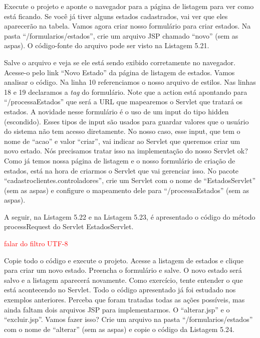 
Execute o projeto e aponte o navegador para a página de listagem para ver como está ficando. Se você já tiver alguns estados cadastrados, vai ver que eles aparecerão na tabela. Vamos agora criar nosso formulário para criar estados. Na pasta ``/formularios/estados'', crie um arquivo JSP chamado ``novo'' (sem as aspas). O código-fonte do arquivo pode ser visto na Listagem 5.21.


Salve o arquivo e veja se ele está sendo exibido corretamente no navegador. Acesse-o pelo link ``Novo Estado'' da página de listagem de estados. Vamos analisar o código. Na linha 10 referenciamos o nosso arquivo de estilos. Nas linhas 18 e 19 declaramos a \textit{tag} do formulário. Note que a action está apontando para ``/processaEstados'' que será a URL que mapearemos o Servlet que tratará os estados. A novidade nesse formulário é o uso de um input do tipo hidden (escondido). Esses tipos de input são usados para guardar valores que o usuário do sistema não tem acesso diretamente. No nosso caso, esse input, que tem o nome de ``acao'' e valor ``criar'', vai indicar ao Servlet que queremos criar um novo estado. Nós precisamos tratar isso na implementação do nosso Servlet ok? Como já temos nossa página de listagem e o nosso formulário de criação de estados, está na hora de criarmos o Servlet que vai gerenciar isso. No pacote ``cadastroclientes.controladores'', crie um Servlet com o nome de ``EstadosServlet'' (sem as aspas) e configure o mapeamento dele para ``/processaEstados'' (sem as aspas).

A seguir, na Listagem 5.22 e na Listagem 5.23, é apresentado o código do método processRequest do Servlet EstadosServlet.


\textcolor{red}{falar do filtro UTF-8}



Copie todo o código e execute o projeto. Acesse a listagem de estados e clique para criar um novo estado. Preencha o formulário e salve. O novo estado será salvo e a listagem aparecerá novamente. Como exercício, tente entender o que está acontecendo no Servlet. Todo o código apresentado já foi estudado nos exemplos anteriores. Perceba que foram tratadas todas as ações possíveis, mas ainda faltam dois arquivos JSP para implementarmos. O ``alterar.jsp'' e o ``excluir.jsp''. Vamos fazer isso? Crie um arquivo na pasta ``/formularios/estados'' com o nome de ``alterar'' (sem as aspas) e copie o código da Listagem 5.24.

